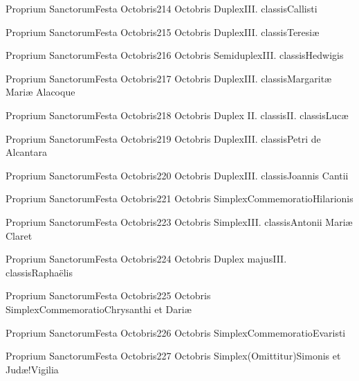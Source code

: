 \documentclass[invitatoriale-romanum.tex]{subfiles}
\begin{document}
	{Proprium Sanctorum}{Festa Octobris}{2}{14 Octobris}
	{Duplex}{III. classis}{Callisti}
	{}
	{}

	{Proprium Sanctorum}{Festa Octobris}{2}{15 Octobris}
	{Duplex}{III. classis}{Teresiæ}
	{}
	{}

	{Proprium Sanctorum}{Festa Octobris}{2}{16 Octobris}
	{Semiduplex}{III. classis}{Hedwigis}
	{}
	{}

	{Proprium Sanctorum}{Festa Octobris}{2}{17 Octobris}
	{Duplex}{III. classis}{Margaritæ Mariæ Alacoque}
	{}
	{}

	{Proprium Sanctorum}{Festa Octobris}{2}{18 Octobris}
	{Duplex II. classis}{II. classis}{Lucæ}
	{}
	{}

	{Proprium Sanctorum}{Festa Octobris}{2}{19 Octobris}
	{Duplex}{III. classis}{Petri de Alcantara}
	{}
	{}

	{Proprium Sanctorum}{Festa Octobris}{2}{20 Octobris}
	{Duplex}{III. classis}{Joannis Cantii}
	{}
	{}

	{Proprium Sanctorum}{Festa Octobris}{2}{21 Octobris}
	{Simplex}{Commemoratio}{Hilarionis}
	{}
	{\invitferia}

	{Proprium Sanctorum}{Festa Octobris}{2}{23 Octobris}
	{Simplex}{III. classis}{Antonii Mariæ Claret}
	{}
	{}

	{Proprium Sanctorum}{Festa Octobris}{2}{24 Octobris}
	{Duplex majus}{III. classis}{Raphaëlis}
	{}
	{}

	{Proprium Sanctorum}{Festa Octobris}{2}{25 Octobris}
	{Simplex}{Commemoratio}{Chrysanthi et Dariæ}
	{}
	{\invitferia}

	{Proprium Sanctorum}{Festa Octobris}{2}{26 Octobris}
	{Simplex}{Commemoratio}{Evaristi}
	{}
	{\invitferia}

	{Proprium Sanctorum}{Festa Octobris}{2}{27 Octobris}
	{Simplex}{(Omittitur)}{Simonis et Judæ!Vigilia}
	{}
	{}
\invitferia
\end{document}
